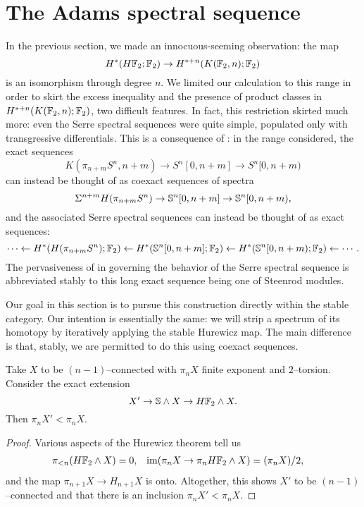 \section{The Adams spectral sequence}

In the previous section, we made an innocuous-seeming observation: the map \[H^*(H\mathbb F_2; \mathbb F_2) \to H^{*+n}(K(\mathbb F_2, n); \mathbb F_2)\] is an isomorphism through degree $n$.
We limited our calculation to this range in order to skirt the excess inequality and the presence of product classes in $H^{*+n}(K(\mathbb F_2, n); \mathbb F_2)$, two difficult features.
In fact, this restriction skirted much more: even the Serre spectral sequences were quite simple, populated only with transgressive differentials.
This is a consequence of : in the range considered, the exact sequences \[K(\pi_{n+m} S^n, n+m) \to S^n[0, n+m] \to S^n[0, n+m)\] can instead be thought of as coexact sequences of spectra \[\Sigma^{n+m} H(\pi_{n+m} S^n) \to \mathbb S^n[0, n+m] \to \mathbb S^n[0, n+m),\] and the associated Serre spectral sequences can instead be thought of as exact sequences: \[\cdots \leftarrow H^*(H(\pi_{n+m} S^n); \mathbb F_2) \leftarrow H^*(\mathbb S^n[0, n+m]; \mathbb F_2) \leftarrow H^*(\mathbb S^n[0, n+m); \mathbb F_2) \leftarrow \cdots.\]
The pervasiveness of  in governing the behavior of the Serre spectral sequence is abbreviated stably to this long exact sequence being one of Steenrod modules.

Our goal in this section is to pursue this construction directly within the stable category.
Our intention is essentially the same: we will strip a spectrum of its homotopy by iteratively applying the stable Hurewicz map.
The main difference is that, stably, we are permitted to do this using coexact sequences.

\begin{lemma}
Take $X$ to be $(n-1)$--connected with $\pi_n X$ finite exponent and $2$--torsion.
Consider the exact extension \[X' \to \mathbb S \wedge X \to H\mathbb F_2 \wedge X.\]
Then $\pi_n X' < \pi_n X$.
\end{lemma}
\begin{proof}
Various aspects of the Hurewicz theorem tell us
\begin{align*}
\pi_{< n}(H\mathbb F_2 \wedge X) & = 0, &
\operatorname{im}(\pi_n X \to \pi_n H\mathbb F_2 \wedge X) & = (\pi_n X) / 2,
\end{align*}
and the map $\pi_{n+1} X \to H_{n+1} X$ is onto.
Altogether, this shows $X'$ to be $(n-1)$--connected and that there is an inclusion $\pi_n X' < \pi_n X$.
\end{proof}

